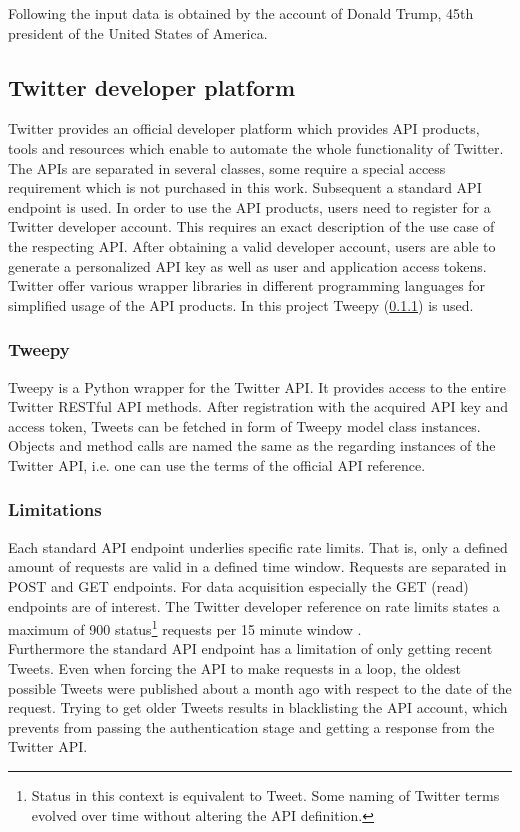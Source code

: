 \documentclass[conference]{IEEEtran}
\begin{document}
Following the input data is obtained by the account of Donald Trump, 45th president of the United States of America.

\subsection{Twitter developer platform}\label{subsec_twitter}

Twitter provides an official developer platform which provides API products, tools and resources which enable to automate the whole functionality of Twitter. The APIs are separated in several classes, some require a special access requirement which is not purchased in this work. Subsequent a standard API endpoint is used. In order to use the API products, users need to register for a Twitter developer account. This requires an exact description of the use case of the respecting API. After obtaining a valid developer account, users are able to generate a personalized API key as well as user and application access tokens. Twitter offer various wrapper libraries in different programming languages for simplified usage of the API products. In this project Tweepy (\ref{subsubsec_tweepy}) is used. \cite{tweepy}

\subsubsection{Tweepy}\label{subsubsec_tweepy}

Tweepy is a Python wrapper for the Twitter API. It provides access to the entire Twitter RESTful API methods. After registration with the acquired API key and access token, Tweets can be fetched in form of Tweepy model class instances. Objects and method calls are named the same as the regarding instances of the Twitter API, i.e. one can use the terms of the official API reference.

\subsubsection{Limitations}

Each standard API endpoint underlies specific rate limits. That is, only a defined amount of requests are valid in a defined time window. Requests are separated in POST and GET endpoints. For data acquisition especially the GET (read) endpoints are of interest. The Twitter developer reference on rate limits states a maximum of 900 status\footnote{Status in this context is equivalent to Tweet. Some naming of Twitter terms evolved over time without altering the API definition.} requests per 15 minute window \cite{twidev_rates}.\\
Furthermore the standard API endpoint has a limitation of only getting recent Tweets. Even when forcing the API to make requests in a loop, the oldest possible Tweets were published about a month ago with respect to the date of the request. Trying to get older Tweets results in blacklisting the API account, which prevents from passing the authentication stage and getting a response from the Twitter API. 
\end{document}

